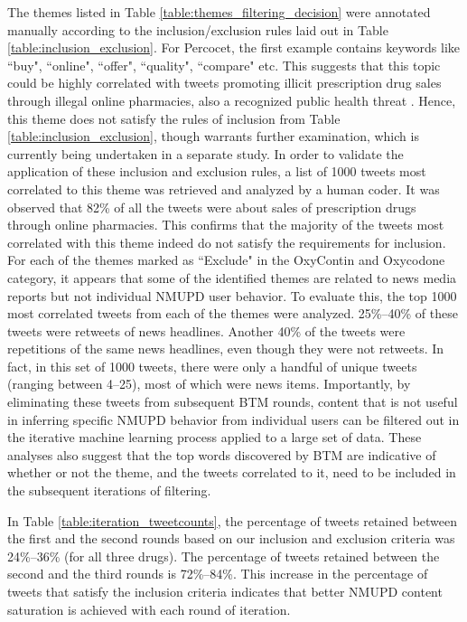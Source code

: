 The themes listed in Table \ref{table:themes_filtering_decision} were annotated manually 
according to the inclusion/exclusion rules laid out in Table \ref{table:inclusion_exclusion}. 
For Percocet, the first example contains keywords like ``buy", ``online", ``offer", ``quality", ``compare" etc. 
This suggests that this topic could be highly correlated with 
tweets promoting illicit prescription drug sales through illegal online pharmacies, 
also a recognized public health threat 
\cite{forman2003availability,forman2006availability,mackey2013digital,raine2009availability}.
Hence, this theme does not satisfy the rules of inclusion from Table \ref{table:inclusion_exclusion}, 
though warrants further examination, 
which is currently being undertaken in a separate study. 
In order to validate the application of these inclusion and 
exclusion rules, a list of 1000 tweets most correlated to this 
theme was retrieved and analyzed by a human coder. 
It was observed that 82\% of all the tweets were about sales 
of prescription drugs through online pharmacies. 
This confirms that the majority of the tweets most correlated 
with this theme indeed do not satisfy the requirements for inclusion.
%
For each of the themes marked as ``Exclude" in the OxyContin and Oxycodone category, 
it appears that some of the identified themes are related to news media 
reports but not individual NMUPD user behavior. 
To evaluate this, the top 1000 most correlated tweets from 
each of the themes were analyzed. 25\%–40\% of these tweets were 
retweets of news headlines. Another 40\% of the tweets were repetitions 
of the same news headlines, even though they were not retweets. 
In fact, in this set of 1000 tweets, there were only a handful of 
unique tweets (ranging between 4–25), most of which were news items. 
Importantly, by eliminating these tweets from subsequent BTM rounds, 
content that is not useful in inferring specific NMUPD behavior 
from individual users can be filtered out in the iterative machine 
learning process applied to a large set of data. 
These analyses also suggest that the top words discovered by 
BTM are indicative of whether or not the theme, and the tweets 
correlated to it, need to be included in the 
subsequent iterations of filtering.

In Table \ref{table:iteration_tweetcounts}, the percentage of tweets retained between 
the first and the second rounds based on our inclusion and 
exclusion criteria was 24\%–36\% (for all three drugs). 
The percentage of tweets retained between the second and 
the third rounds is 72\%–84\%. This increase in the percentage 
of tweets that satisfy the inclusion criteria indicates 
that better NMUPD content saturation is achieved with each round of iteration.

